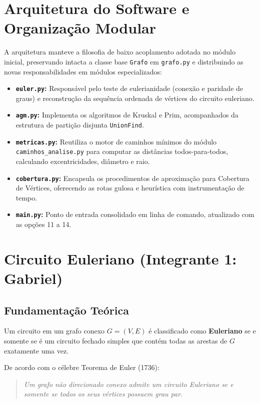 \documentclass[12pt,a4paper]{article}
\begin{document}
\section{Arquitetura do Software e Organização Modular}

A arquitetura manteve a filosofia de baixo acoplamento adotada no módulo inicial, preservando intacta a classe base \texttt{Grafo} em \texttt{grafo.py} e distribuindo as novas responsabilidades em módulos especializados:

\begin{itemize}
    \item \textbf{\texttt{euler.py}:} Responsável pelo teste de eulerianidade (conexão e paridade de graus) e reconstrução da sequência ordenada de vértices do circuito euleriano.
    \item \textbf{\texttt{agm.py}:} Implementa os algoritmos de Kruskal e Prim, acompanhados da estrutura de partição disjunta \texttt{UnionFind}.
    \item \textbf{\texttt{metricas.py}:} Reutiliza o motor de caminhos mínimos do módulo \texttt{caminhos\_analise.py} para computar as distâncias todos-para-todos, calculando excentricidades, diâmetro e raio.
    \item \textbf{\texttt{cobertura.py}:} Encapsula os procedimentos de aproximação para Cobertura de Vértices, oferecendo as rotas gulosa e heurística com instrumentação de tempo.
    \item \textbf{\texttt{main.py}:} Ponto de entrada consolidado em linha de comando, atualizado com as opções 11 a 14.
\end{itemize}

\section{Circuito Euleriano (Integrante 1: Gabriel)}

\subsection{Fundamentação Teórica}
Um circuito em um grafo conexo $G = (V, E)$ é classificado como \textbf{Euleriano} se e somente se é um circuito fechado simples que contém todas as arestas de $G$ exatamente uma vez. 

De acordo com o célebre Teorema de Euler (1736):
\begin{quote}
    \textit{Um grafo não direcionado conexo admite um circuito Euleriano se e somente se todos os seus vértices possuem grau par.}
\end{quote}
\end{document}
